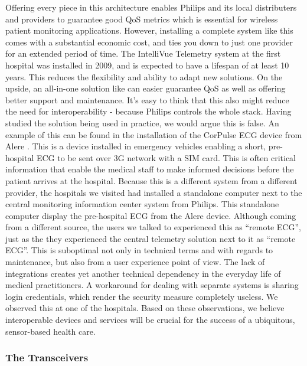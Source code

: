 Offering every piece in this architecture enables Philips and its local distributers and providers to guarantee good QoS metrics which is essential for wireless patient monitoring applications. However, installing a complete system like this comes with a substantial economic cost, and ties you down to just one provider for an extended period of time. The IntelliVue Telemetry system at the first hospital was installed in 2009, and is expected to have a lifespan of at least 10 years. This reduces the flexibility and ability to adapt new solutions. On the upside, an all-in-one solution like can easier guarantee QoS as well as offering better support and maintenance. It's easy to think that this also might reduce the need for interoperability - because Philips controls the whole stack. Having studied the solution being used in practice, we would argue this is false. An example of this can be found in the installation of the CorPulse ECG device from Alere \cite{alere}. This is a device installed in emergency vehicles enabling a short, pre-hospital ECG to be sent over 3G network with a SIM card. This is often critical information that enable the medical staff to make informed decisions before the patient arrives at the hospital. Because this is a different system from a different provider, the hospitals we visited had installed a standalone computer next to the central monitoring information center system from Philips. This standalone computer display the pre-hospital ECG from the Alere device. Although coming from a different source, the users we talked to experienced this as ``remote ECG'', just as the they experienced the central telemetry solution next to it as ``remote ECG''. This is suboptimal not only in technical terms and with regards to maintenance, but also from a user experience point of view. The lack of integrations creates yet another technical dependency in the everyday life of medical practitioners. A workaround for dealing with separate systems is sharing login credentials, which render the security measure completely useless. We observed this at one of the hospitals. Based on these observations, we believe interoperable devices and services will be crucial for the success of a ubiquitous, sensor-based health care.


\subsubsection{The Transceivers} %
\label{ssub:the_transceivers}

